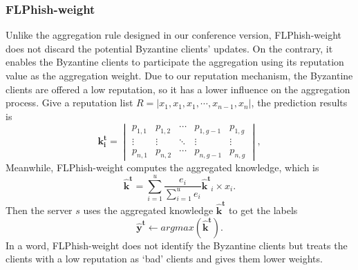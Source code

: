 \documentclass[journal]{IEEEtran}
\begin{document}
\subsubsection{{FLPhish-weight}}
Unlike the aggregation rule designed in our conference version, FLPhish-weight does not discard the potential Byzantine clients' updates. On the contrary, it enables the Byzantine clients to participate the aggregation using its reputation value as the aggregation weight. Due to our reputation mechanism, the Byzantine clients are offered a low reputation, so it has a lower influence on the aggregation process.
Give a reputation list $R=\left | x_{1},x_{1},x_{1},\cdots ,x_{n-1},x_{n} \right |$, the prediction results is 
  \begin{equation}
    \mathbf{k_i^t}=\begin{vmatrix}
      p_{1,1} & p_{1,2} & \cdots  & p_{1,g-1} & p_{1,g}\\ 
      \vdots  & \vdots & \ddots  & \vdots & \vdots\\ 
      p_{n,1} & p_{n,2} & \cdots  & p_{n,g-1} & p_{n,g}
      \end{vmatrix},
  \end{equation}
  Meanwhile, FLPhish-weight computes the aggregated knowledge, which is
    \begin{equation}
    \mathbf{\hat{k}^t}=\sum_{i=1}^{u}\frac{e_i}{\sum_{i=1}^{u}e_i}\mathbf{\hat{k}^t}_i\times x_{i}.
  \end{equation}
  Then the server $s$ uses the aggregated knowledge $\mathbf{\hat{k}^t}$ to get the labels
  \begin{equation}
    \mathbf{\hat{y}^t}\gets argmax(\mathbf{\hat{k}^t}).
  \end{equation} 
In a word, FLPhish-weight does not identify the Byzantine clients but treats the clients with a low reputation as `bad' clients and gives them lower weights.
\end{document}
